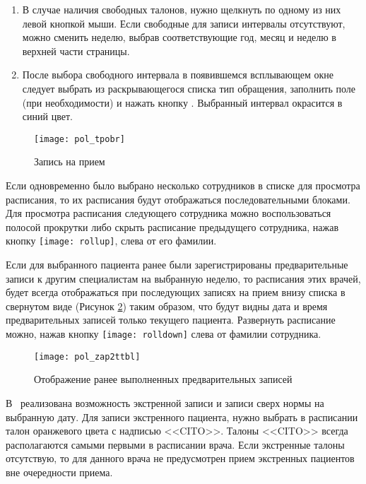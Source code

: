 \begin{enumerate}
 \item В случае наличия свободных талонов, нужно щелкнуть по одному из них левой кнопкой мыши. Если свободные для записи интервалы отсутствуют, можно сменить неделю, выбрав соответствующие год, месяц и неделю в верхней части страницы.
 \item После выбора свободного интервала в появившемся всплывающем окне следует выбрать из раскрывающегося списка тип обращения, заполнить поле  (при необходимости) и нажать кнопку . Выбранный интервал окрасится в синий цвет.
\end{enumerate}

 \begin{figure}[ht]\centering
  \texttt{[image: pol\_tpobr]}
  \caption{Запись на прием}
  \label{img_pol_tpobr}
 \end{figure}

Если одновременно было выбрано несколько сотрудников в списке для просмотра расписания, то их расписания будут отображаться последовательными блоками. Для просмотра расписания следующего сотрудника можно воспользоваться полосой прокрутки либо скрыть расписание предыдущего сотрудника, нажав кнопку \texttt{[image: rollup]}, слева от его фамилии.

Если для выбранного пациента ранее были зарегистрированы предварительные записи к другим специалистам на выбранную неделю, то расписания этих врачей, будет всегда отображаться при последующих записях на прием внизу списка в свернутом виде (Рисунок \ref{img_pol_zap2ttbl}) таким образом, что будут видны дата и время предварительных записей только текущего пациента. Развернуть расписание можно, нажав кнопку \texttt{[image: rolldown]} слева от фамилии сотрудника.

 \begin{figure}[ht]\centering
  \texttt{[image: pol\_zap2ttbl]}
  \caption{Отображение ранее выполненных предварительных записей}
  \label{img_pol_zap2ttbl}
 \end{figure}
     
В \tmis~реализована возможность экстренной записи и записи сверх нормы на выбранную дату. Для записи экстренного пациента, нужно выбрать в расписании талон оранжевого цвета с надписью <<CITO>>. Талоны <<CITO>> всегда располагаются самыми первыми в расписании врача. Если экстренные талоны отсутствую, то для данного врача не предусмотрен прием экстренных пациентов вне очередности приема.

